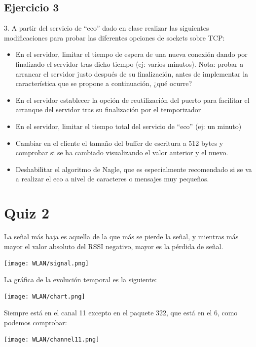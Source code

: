 \documentclass{article}
\begin{document}
\subsection{Ejercicio 3}

3. A partir del servicio de “eco” dado en clase realizar las siguientes modificaciones para
probar las diferentes opciones de sockets sobre TCP:
\begin{itemize}
\item En el servidor, limitar el tiempo de espera de una nueva conexión dando por finalizado
el servidor tras dicho tiempo (ej: varios minutos). Nota: probar a arrancar el servidor
justo después de su finalización, antes de implementar la característica que se propone
a continuación, ¿qué ocurre?
\item En el servidor establecer la opción de reutilización del puerto para facilitar el arranque
del servidor tras su finalización por el temporizador
\item En el servidor, limitar el tiempo total del servicio de “eco” (ej: un minuto)
\item Cambiar en el cliente el tamaño del buffer de escritura a 512 bytes y comprobar si se
ha cambiado visualizando el valor anterior y el nuevo.
\item Deshabilitar el algoritmo de Nagle, que es especialmente recomendado si se va a
realizar el eco a nivel de caracteres o mensajes muy pequeños.
\end{itemize}

\section{Quiz 2}

La señal más baja es aquella de la que más se pierde la señal, y mientras más mayor el valor absoluto del RSSI negativo, mayor es la pérdida de señal.

\begin{center}
\texttt{[image: WLAN/signal.png]} 
\end{center}

La gráfica de la evolución temporal es la siguiente:

\begin{center}
\texttt{[image: WLAN/chart.png]} 
\end{center}

Siempre está en el canal 11 excepto en el paquete 322, que está en el 6, como podemos comprobar:

\begin{center}
\texttt{[image: WLAN/channel11.png]} 
\end{center}
\end{document}
